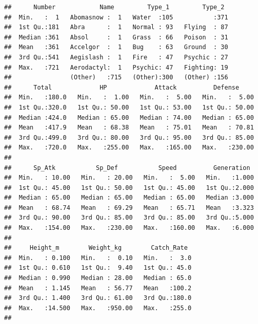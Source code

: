 \documentclass[]{article}
\begin{document}
\begin{verbatim}
##      Number            Name         Type_1         Type_2   
##  Min.   :  1   Abomasnow :  1   Water  :105           :371  
##  1st Qu.:181   Abra      :  1   Normal : 93   Flying  : 87  
##  Median :361   Absol     :  1   Grass  : 66   Poison  : 31  
##  Mean   :361   Accelgor  :  1   Bug    : 63   Ground  : 30  
##  3rd Qu.:541   Aegislash :  1   Fire   : 47   Psychic : 27  
##  Max.   :721   Aerodactyl:  1   Psychic: 47   Fighting: 19  
##                (Other)   :715   (Other):300   (Other) :156  
##      Total             HP             Attack          Defense      
##  Min.   :180.0   Min.   :  1.00   Min.   :  5.00   Min.   :  5.00  
##  1st Qu.:320.0   1st Qu.: 50.00   1st Qu.: 53.00   1st Qu.: 50.00  
##  Median :424.0   Median : 65.00   Median : 74.00   Median : 65.00  
##  Mean   :417.9   Mean   : 68.38   Mean   : 75.01   Mean   : 70.81  
##  3rd Qu.:499.0   3rd Qu.: 80.00   3rd Qu.: 95.00   3rd Qu.: 85.00  
##  Max.   :720.0   Max.   :255.00   Max.   :165.00   Max.   :230.00  
##                                                                    
##      Sp_Atk           Sp_Def           Speed          Generation   
##  Min.   : 10.00   Min.   : 20.00   Min.   :  5.00   Min.   :1.000  
##  1st Qu.: 45.00   1st Qu.: 50.00   1st Qu.: 45.00   1st Qu.:2.000  
##  Median : 65.00   Median : 65.00   Median : 65.00   Median :3.000  
##  Mean   : 68.74   Mean   : 69.29   Mean   : 65.71   Mean   :3.323  
##  3rd Qu.: 90.00   3rd Qu.: 85.00   3rd Qu.: 85.00   3rd Qu.:5.000  
##  Max.   :154.00   Max.   :230.00   Max.   :160.00   Max.   :6.000  
##                                                                    
##     Height_m        Weight_kg        Catch_Rate   
##  Min.   : 0.100   Min.   :  0.10   Min.   :  3.0  
##  1st Qu.: 0.610   1st Qu.:  9.40   1st Qu.: 45.0  
##  Median : 0.990   Median : 28.00   Median : 65.0  
##  Mean   : 1.145   Mean   : 56.77   Mean   :100.2  
##  3rd Qu.: 1.400   3rd Qu.: 61.00   3rd Qu.:180.0  
##  Max.   :14.500   Max.   :950.00   Max.   :255.0  
## 
\end{verbatim}
\end{document}
